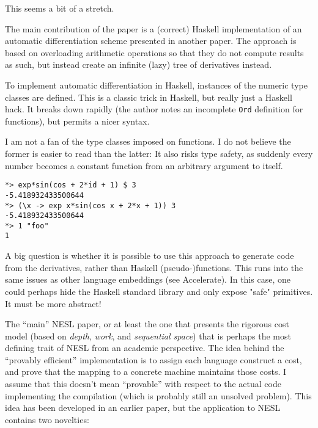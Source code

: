 \documentclass[a4paper, oneside, final]{memoir}
\begin{document}
This seems a bit of a stretch.

The main contribution of the paper is a (correct) Haskell
implementation of an automatic differentiation scheme presented in
another paper.  The approach is based on overloading arithmetic
operations so that they do not compute results as such, but instead
create an infinite (lazy) tree of derivatives instead.

To implement automatic differentiation in Haskell, instances of the
numeric type classes are defined.  This is a classic trick in Haskell,
but really just a Haskell hack.  It breaks down rapidly (the author
notes an incomplete \texttt{Ord} definition for functions), but
permits a nicer syntax.

I am not a fan of the type classes imposed on functions.  I do not
believe the former is easier to read than the latter: It also risks
type safety, as suddenly every number becomes a constant function from
an arbitrary argument to itself.

\begin{verbatim}
*> exp*sin(cos + 2*id + 1) $ 3
-5.418932433500644
*> (\x -> exp x*sin(cos x + 2*x + 1)) 3
-5.418932433500644
*> 1 "foo"
1
\end{verbatim}

A big question is whether it is possible to use this approach to
generate code from the derivatives, rather than Haskell
(pseudo-)functions.  This runs into the same issues as other language
embeddings (see Accelerate).  In this case, one could perhaps hide the
Haskell standard library and only expose "safe" primitives.  It must
be more abstract!

\begin{quote}
\end{quote}

The ``main'' NESL paper, or at least the one that presents the
rigorous cost model (based on \textit{depth}, \textit{work}, and
\textit{sequential space}) that is perhaps the most defining trait of
NESL from an academic perspective.  The idea behind the ``provably
efficient'' implementation is to assign each language construct a
cost, and prove that the mapping to a concrete machine maintains those
costs.  I assume that this doesn't mean ``provable'' with respect to
the actual code implementing the compilation (which is probably still
an unsolved problem).  This idea has been developed in an earlier
paper, but the application to NESL contains two novelties:
\end{document}
